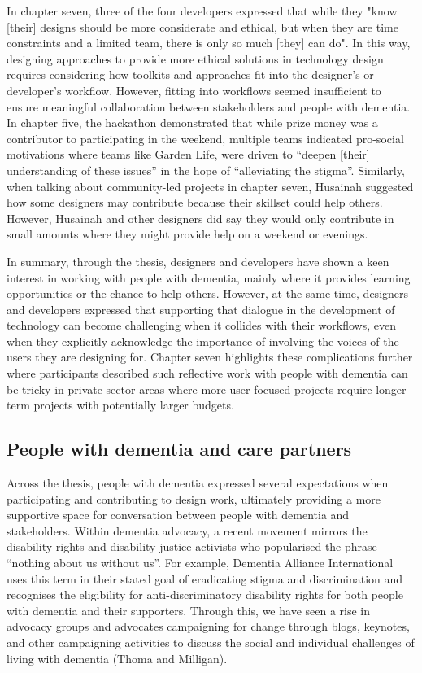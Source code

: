 In chapter seven, three of the four developers expressed that while they "know [their] designs should be more considerate and ethical,   but when they are time constraints and a limited team, there is only so much [they] can do". In this way, designing approaches to provide more ethical solutions in technology design requires considering how toolkits and approaches fit into the designer's or developer's workflow. However, fitting into workflows seemed insufficient to ensure meaningful collaboration between stakeholders and people with dementia. In chapter five, the hackathon demonstrated that while prize money was a contributor to participating in the weekend, multiple teams indicated pro-social motivations where teams like Garden Life, were driven to ``deepen [their] understanding of these issues'' in the hope of ``alleviating the stigma''. Similarly, when talking about community-led projects in chapter seven, Husainah suggested how some designers may contribute because their skillset could help others. However, Husainah and other designers did say they would only contribute in small amounts where they might provide help on a weekend or evenings. 

In summary, through the thesis, designers and developers have shown a keen interest in working with people with dementia, mainly where it provides learning opportunities or the chance to help others. However, at the same time, designers and developers expressed that supporting that dialogue in the development of technology can become challenging when it collides with their workflows, even when they explicitly acknowledge the importance of involving the voices of the users they are designing for. Chapter seven highlights these complications further where participants described such reflective work with people with dementia can be tricky in private sector areas where more user-focused projects require longer-term projects with potentially larger budgets.

\subsection{People with dementia and care partners}
\label{PwDInterests}

Across the thesis, people with dementia expressed several expectations when participating and contributing to design work, ultimately providing a more supportive space for conversation between people with dementia and stakeholders. Within dementia advocacy, a recent movement mirrors the disability rights and disability justice activists who popularised the phrase ``nothing about us without us''. For example, Dementia Alliance International uses this term in their stated goal of eradicating stigma and discrimination and recognises the eligibility for anti-discriminatory disability rights for both people with dementia and their supporters. Through this, we have seen a rise in advocacy groups and advocates campaigning for change through blogs, keynotes, and other campaigning activities to discuss the social and individual challenges of living with dementia (Thoma and Milligan).

